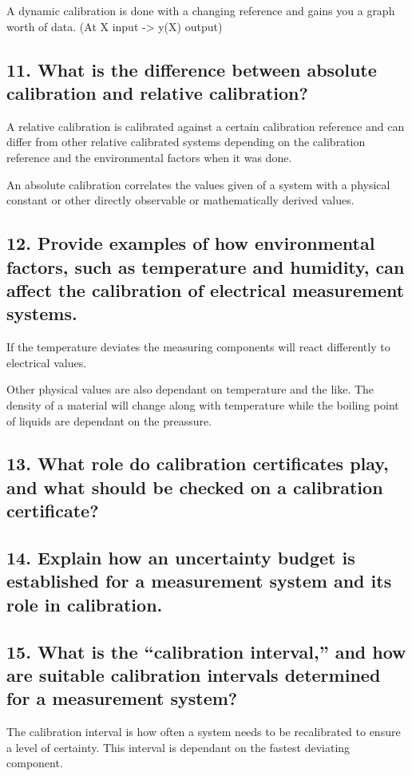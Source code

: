 A dynamic calibration is done with a changing reference and gains you a graph worth of data. (At X input -> y(X) output)

\subsection{\textbf{11. What is the difference between absolute calibration and relative calibration?}}
A relative calibration is calibrated against a certain calibration reference and can differ from other relative calibrated systems depending on the calibration reference and the environmental factors when it was done.

An absolute calibration correlates the values given of a system with a physical constant or other directly observable or mathematically derived values.


\subsection{\textbf{12. Provide examples of how environmental factors, such as temperature and humidity, can affect the calibration of electrical measurement systems.}}

If the temperature deviates the measuring components will react differently to electrical values. 

Other physical values are also dependant on temperature and the like. The density of a material will change along with temperature while the boiling point of liquids are dependant on the preassure.


\subsection{\textbf{13. What role do calibration certificates play, and what should be checked on a calibration certificate?}}


\subsection{\textbf{14. Explain how an uncertainty budget is established for a measurement system and its role in calibration.}}


\subsection{\textbf{15. What is the “calibration interval,” and how are suitable calibration intervals determined for a measurement system?}}
The calibration interval is how often a system needs to be recalibrated to ensure a level of certainty. This interval is dependant on the fastest deviating component. 
